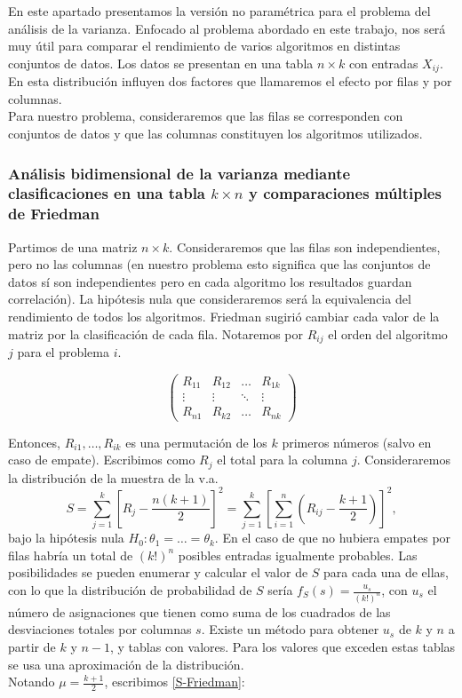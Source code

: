 	En este apartado presentamos la versión no paramétrica 
para el problema del análisis de la varianza. Enfocado al 
problema abordado en este trabajo, nos será muy útil para 
comparar el rendimiento de varios algoritmos en distintas 
conjuntos de datos. Los datos se presentan en una tabla $n \times 
k$ con entradas $X_{ij}$. En esta distribución influyen dos 
factores que llamaremos el efecto por filas y por columnas.\\
	Para nuestro problema, consideraremos que las filas se 
corresponden con conjuntos de datos y que las columnas 
constituyen los algoritmos utilizados. 
	
\subsubsection{Análisis bidimensional de la varianza mediante clasificaciones en una tabla $k \times n$ y comparaciones múltiples de Friedman}

	Partimos de una matriz $n \times k$. Consideraremos que 
las filas son independientes, pero no las columnas (en 
nuestro problema esto significa que las conjuntos de datos sí 
son independientes pero en cada algoritmo los resultados guardan 
correlación). La hipótesis nula que consideraremos será la 
equivalencia del rendimiento de todos los algoritmos.
Friedman sugirió cambiar cada valor de la 
matriz por la clasificación de cada fila. Notaremos por $R_{ij}$
el orden del algoritmo $j$ para el problema $i$.

	\[ \left( \begin{matrix}
		R_{11} & R_{12} & \dots & R_{1k} \\
		\vdots & \vdots & \ddots & \vdots \\
		R_{n1} & R_{k2} & \dots & R_{nk}
		\end{matrix} \right)	\]

	Entonces, $R_{i1}, \dots, R_{ik}$ es una permutación de 
los $k$ primeros números (salvo en caso de empate). 
Escribimos como $R_j$ el total para la columna $j$. 
Consideraremos la distribución de la muestra de la v.a. 
	\begin{equation}
		 S = \sum\limits_{j=1}^k
				\left[
					R_j - \frac{n(k+1)}{2}
				\right]^2 =
			\sum\limits_{j=1}^k \left[
				\sum\limits_{i=1}^n \left(
					R_{ij} - \frac{k+1}{2}
				\right)
			\right]^2,
	\label{S-Friedman}
	\end{equation}
bajo la hipótesis nula $H_0: \theta_1 = \dots = 
\theta_k$. En el caso de que no hubiera empates por filas 
habría un total de $(k!)^n$ posibles entradas igualmente 
probables. Las posibilidades se pueden enumerar y calcular el 
valor de $S$ para cada una de ellas, con lo que la 
distribución de probabilidad de $S$ sería $f_S(s) = 
\frac{u_s}{(k!)^n}$, con $u_s$ el número de asignaciones que 
tienen como suma de los cuadrados de las desviaciones totales 
por columnas $s$. Existe un método para obtener $u_s$ de $k$ 
y $n$ a partir de $k$ y $n-1$, y tablas con valores. Para los 
valores que exceden estas tablas se usa una aproximación de 
la distribución.\\
	Notando $\mu = \frac{k+1}{2}$, escribimos 
	\ref{S-Friedman}:
	
